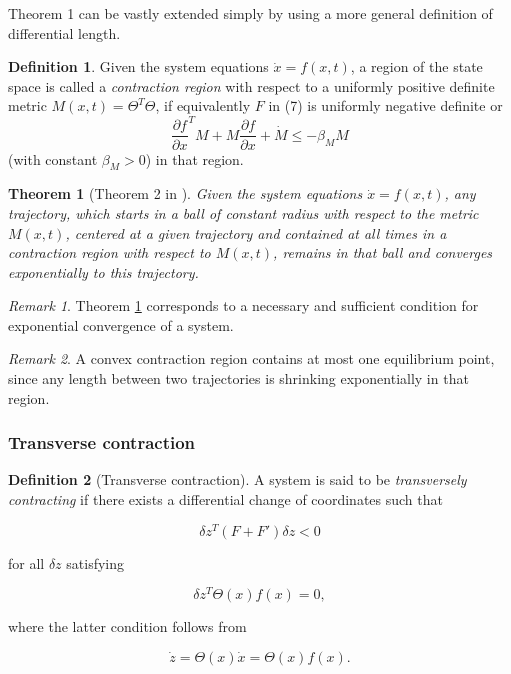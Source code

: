\documentclass{article}
\newtheorem{theorem}{Theorem}
\theoremstyle{definition} \newtheorem{definition}{Definition}
\theoremstyle{remark} \newtheorem{remark}{Remark}
\newcounter{ct}
\begin{document}
Theorem 1 can be vastly extended simply by using a more general definition of differential length.


\begin{definition}
Given the system equations \(\dot{x} = f(x, t)\), a region of the state space is called a \textit{contraction region} with respect to a uniformly positive definite metric \( M(x, t) = \Theta^T \Theta \), if equivalently \( F \) in (7) is uniformly negative definite or  
\[
\frac{\partial f}{\partial x}^T M + M \frac{\partial f}{\partial x} + \dot{M} \leq -\beta_M M
\]
(with constant \( \beta_M > 0 \)) in that region.
\end{definition}

\begin{theorem}[Theorem 2 in \citep{lohmiller1998contraction}]\label{thrm:contractive}
Given the system equations $\dot x = f(x,t)$, any trajectory, which starts in a ball of constant radius with respect to the metric $M(x,t)$, centered at a given trajectory and contained at all times in a contraction region with respect to $M(x,t)$,  remains in that ball and converges exponentially to this trajectory.
\end{theorem}

\begin{remark}
Theorem \ref{thrm:contractive} corresponds to a necessary and sufficient condition for exponential convergence of a system. 
\end{remark}

\begin{remark}
A convex contraction region contains at most one equilibrium point, since any length between two trajectories is shrinking exponentially in that region.
\end{remark}

\subsubsection{Transverse contraction}
\begin{definition}[Transverse contraction] 
A system is said to be \textit{transversely contracting} if there exists a differential change of coordinates such that  

\[
\delta z^T (F + F') \delta z < 0
\]

for all \( \delta z \) satisfying  

\[
\delta z^T \Theta(x) f(x) = 0,
\]

where the latter condition follows from  

\[
\dot{z} = \Theta(x) \dot{x} = \Theta(x) f(x).
\]

\end{definition}
\end{document}
